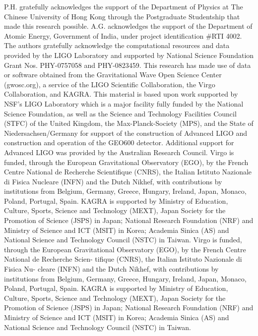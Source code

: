 \documentclass[aps,prd,twocolumn,superscriptaddress,groupedaddress,nofootinbib,showpacs,eqsecnum,useAms]{revtex4-2}
\begin{document}
P.H. gratefully acknowledges the support of the Department of Physics at The Chinese University of Hong Kong through the Postgraduate Studentship that made this research possible. A.G. acknowledges the support of the Department of Atomic Energy, Government of India, under project identification \#RTI 4002. The authors gratefully acknowledge the computational resources and data provided by the LIGO Laboratory and supported by National Science Foundation Grant Nos. PHY-0757058 and PHY-0823459. 
This research has made use of data or software obtained from the Gravitational Wave Open Science Center (gwosc.org), a service of the LIGO Scientific Collaboration, the Virgo Collaboration, and KAGRA.
This material is based upon work supported by NSF’s LIGO Laboratory which is a major facility fully funded by the National Science Foundation, as well as the Science and Technology Facilities Council (STFC) of the United Kingdom, the Max-Planck-Society (MPS), and the State of Niedersachsen/Germany for support of the construction of Advanced LIGO and construction and operation of the GEO600 detector. Additional support for Advanced LIGO was provided by the Australian Research Council. Virgo is funded, through the European Gravitational Observatory (EGO), by the French Centre National de Recherche Scientifique (CNRS), the Italian Istituto Nazionale di Fisica Nucleare (INFN) and the Dutch Nikhef, with contributions by institutions from Belgium, Germany, Greece, Hungary, Ireland, Japan, Monaco, Poland, Portugal, Spain. KAGRA is supported by Ministry of Education, Culture, Sports, Science and Technology (MEXT), Japan Society for the Promotion of Science (JSPS) in Japan; National Research Foundation (NRF) and Ministry of Science and ICT (MSIT) in Korea; Academia Sinica (AS) and National Science and Technology Council (NSTC) in Taiwan. Virgo is funded, through the European Gravitational Observatory (EGO), by the French Centre National de Recherche Scien- tifique (CNRS), the Italian Istituto Nazionale di Fisica Nu- cleare (INFN) and the Dutch Nikhef, with contributions by institutions from Belgium, Germany, Greece, Hungary, Ireland, Japan, Monaco, Poland, Portugal, Spain. KAGRA is supported by Ministry of Education, Culture, Sports, Science and Technology (MEXT), Japan Society for the Promotion of Science (JSPS) in Japan; National Research Foundation (NRF) and Ministry of Science and ICT (MSIT) in Korea; Academia Sinica (AS) and National Science and Technology Council (NSTC) in Taiwan.
\end{document}

